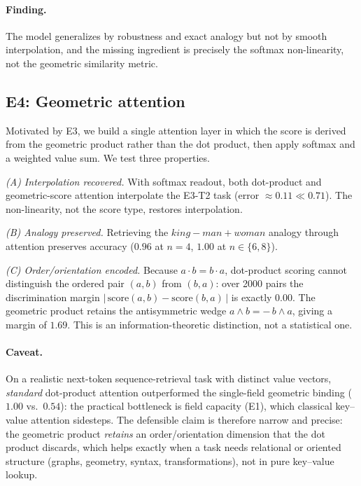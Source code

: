 \documentclass[10pt,twocolumn]{article}
\begin{document}
\paragraph{Finding.} The model generalizes by robustness and exact analogy but
not by smooth interpolation, and the missing ingredient is precisely the softmax
non-linearity, not the geometric similarity metric.

\subsection{E4: Geometric attention}
Motivated by E3, we build a single attention layer in which the score is derived
from the geometric product rather than the dot product, then apply softmax and a
weighted value sum. We test three properties.

\emph{(A) Interpolation recovered.} With softmax readout, both dot-product and
geometric-score attention interpolate the E3-T2 task (error $\approx 0.11 \ll
0.71$). The non-linearity, not the score type, restores interpolation.

\emph{(B) Analogy preserved.} Retrieving the $\textit{king}-\textit{man}+
\textit{woman}$ analogy through attention preserves accuracy
($0.96$ at $n{=}4$, $1.00$ at $n\in\{6,8\}$).

\emph{(C) Order/orientation encoded.} Because
$a\cdot b=b\cdot a$, dot-product scoring cannot distinguish the ordered pair
$(a,b)$ from $(b,a)$: over 2000 pairs the discrimination margin
$|\,\mathrm{score}(a,b)-\mathrm{score}(b,a)\,|$ is exactly $0.00$. The geometric
product retains the antisymmetric wedge $a\wedge b=-\,b\wedge a$, giving a margin
of $1.69$. This is an information-theoretic distinction, not a statistical one.

\paragraph{Caveat.} On a realistic next-token sequence-retrieval task with
distinct value vectors, \emph{standard} dot-product attention outperformed the
single-field geometric binding ($1.00$ vs.\ $0.54$): the practical bottleneck is
field capacity (E1), which classical key--value attention sidesteps. The
defensible claim is therefore narrow and precise: the geometric product
\emph{retains} an order/orientation dimension that the dot product discards, which
helps exactly when a task needs relational or oriented structure (graphs,
geometry, syntax, transformations), not in pure key--value lookup.
\end{document}
